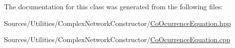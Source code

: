 The documentation for this class was generated from the following files\+:\begin{DoxyCompactItemize}
\item 
Sources/\+Utilities/\+Complex\+Network\+Constructor/\hyperlink{_co_ocurrence_equation_8hpp}{Co\+Ocurrence\+Equation.\+hpp}\item 
Sources/\+Utilities/\+Complex\+Network\+Constructor/\hyperlink{_co_ocurrence_equation_8cpp}{Co\+Ocurrence\+Equation.\+cpp}\end{DoxyCompactItemize}
